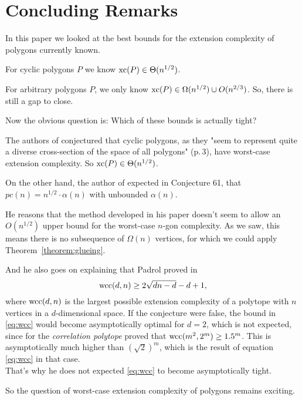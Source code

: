 \section{Concluding Remarks}

In this paper we looked at the best bounds for the extension complexity of polygons currently known. 

For cyclic polygons $P$ we know $\operatorname{xc}(P) \in \Theta(n^{1/2})$.

For arbitrary polygons $P$, we only know $\operatorname{xc}(P) \in \Omega(n^{1/2}) \cup O(n^{2/3})$. So, there is still a gap to close.

Now the obvious question is: Which of these bounds is actually tight?

The authors of \cite{kwan2020extension} conjectured that cyclic polygons, as they "seem to represent quite a diverse cross-section of the space of all polygons" (p.\,3), have worst-case extension complexity. So $\operatorname{xc}(P) \in \Theta(n^{1/2})$.

On the other hand, the author of \cite{shitov2020sublinear} expected in Conjecture 61, that $pc(n) = n^{1/2} \cdot \alpha(n)$ with unbounded $\alpha(n)$.

He reasons that the method developed in his paper doesn't seem to allow an $O(n^{1/2})$ upper bound for the worst-case $n$-gon complexity. As we saw, this means there is no subsequence of $\Omega(n)$ vertices, for which we could apply Theorem~\ref{theorem:glueing}.

And he also goes on explaining that Padrol proved in \cite{padrol2016extension} 
\begin{equation}\label{eq:wcc}
  \operatorname{wcc}(d,n) \geq 2\sqrt{dn-d}-d+1 ,
\end{equation}
where $\operatorname{wcc}(d,n)$ is the largest possible extension complexity of a polytope with $n$ vertices in a $d$-dimensional space. 
If the conjecture were false, the bound in \eqref{eq:wcc} would become asymptotically optimal for $d=2$, which is not expected, since for the \emph{correlation polytope} \cite{kaibel2015short} proved that $\operatorname{wcc}(m^2,2^m) \geq 1.5^m$. This is asymptotically much higher than $(\sqrt{2})^m$, which is the result of equation \eqref{eq:wcc} in that case.\\
That's why he does not expected \eqref{eq:wcc} to become asymptotically tight.

So the question of worst-case extension complexity of polygons remains exciting.
